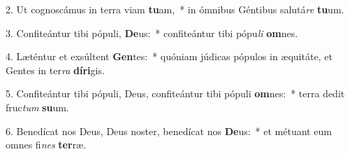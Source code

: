 2. Ut cognoscámus in terra viam \textbf{tu}am,~*  in ómnibus Géntibus salutá\textit{re} \textbf{tu}um.\

3. Confiteántur tibi pópuli, \textbf{De}us:~*  confiteántur tibi pópu\textit{li} \textbf{om}nes.\

4. Læténtur et exsúltent \textbf{Gen}tes:~*  quóniam júdicas pópulos in æquitáte, et Gentes in ter\textit{ra} \textbf{dí}\textbf{ri}gis.\

5. Confiteántur tibi pópuli, Deus, confiteántur tibi pópuli \textbf{om}nes:~*  terra dedit fruc\textit{tum} \textbf{su}um.\

6. Benedícat nos Deus, Deus noster, benedícat nos \textbf{De}us:~*  et métuant eum omnes fi\textit{nes} \textbf{ter}ræ.\

